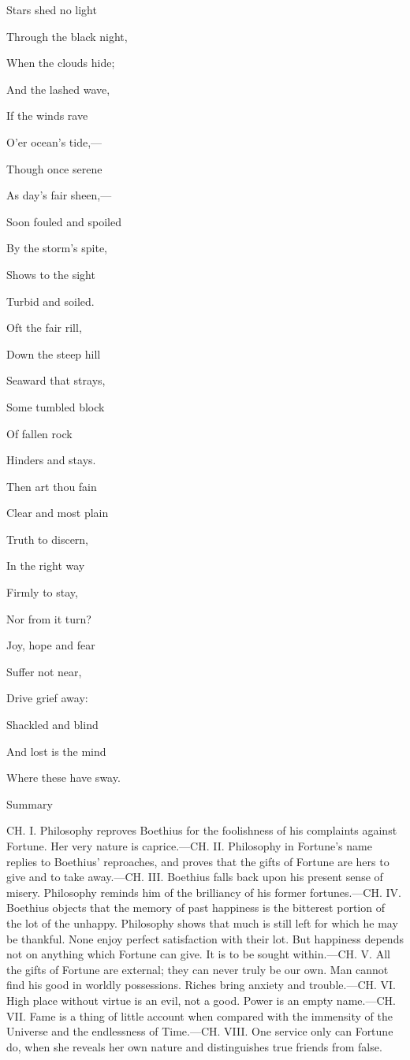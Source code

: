 
Stars shed no light

Through the black night,

When the clouds hide;

And the lashed wave,

If the winds rave

O'er ocean's tide,—

Though once serene

As day's fair sheen,—

Soon fouled and spoiled

By the storm's spite,

Shows to the sight

Turbid and soiled.

Oft the fair rill,

Down the steep hill

Seaward that strays,

Some tumbled block

Of fallen rock

Hinders and stays.

Then art thou fain

Clear and most plain

Truth to discern,

In the right way

Firmly to stay,

Nor from it turn?

Joy, hope and fear

Suffer not near,

Drive grief away:

Shackled and blind

And lost is the mind

Where these have sway.


Summary

CH. I. Philosophy reproves Boethius for the foolishness of his
complaints against Fortune. Her very nature is caprice.—CH. II.
Philosophy in Fortune's name replies to Boethius' reproaches, and
proves that the gifts of Fortune are hers to give and to take
away.—CH. III. Boethius falls back upon his present sense of
misery. Philosophy reminds him of the brilliancy of his former
fortunes.—CH. IV. Boethius objects that the memory of past
happiness is the bitterest portion of the lot of the unhappy.
Philosophy shows that much is still left for which he may be
thankful. None enjoy perfect satisfaction with their lot. But
happiness depends not on anything which Fortune can give. It is to
be sought within.—CH. V. All the gifts of Fortune are external;
they can never truly be our own. Man cannot find his good in
worldly possessions. Riches bring anxiety and trouble.—CH. VI.
High place without virtue is an evil, not a good. Power is an empty
name.—CH. VII. Fame is a thing of little account when compared
with the immensity of the Universe and the endlessness of
Time.—CH. VIII. One service only can Fortune do, when she reveals
her own nature and distinguishes true friends from false.

